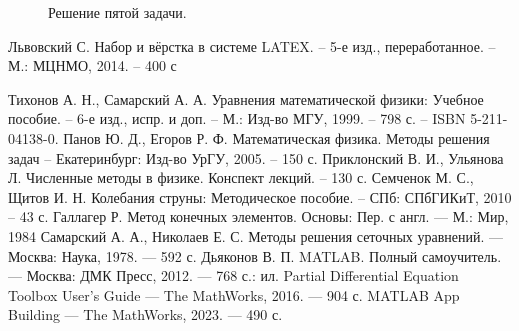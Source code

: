 \documentclass[12pt,a4paper,russian]{report}
\begin{document}
	\begin{figure}[h]
		\caption{Решение пятой задачи.}
		\label{img:fifth_task}
	\end{figure}
	


	\newpage
	\makeatletter
	\begin{thebibliography}{99}
		
		 Львовский С. Набор и вёрстка в системе LATEX. -- 5-е изд., переработанное. -- М.: МЦНМО, 2014. -- 400 с
		
		
		
		
		 Тихонов А. Н., Самарский А. А. Уравнения математической физики: Учебное пособие. -- 6-е изд., испр. и доп. -- М.: Изд-во МГУ, 1999. -- 798 с. -- ISBN 5-211-04138-0.
		 Панов Ю. Д., Егоров Р. Ф. Математическая физика. Методы решения задач -- Екатеринбург: Изд-во УрГУ, 2005. -- 150 с.
		 Приклонский В. И., Ульянова Л. Численные методы в физике. Конспект лекций. -- 130 с.
		 Семченок М. С., Щитов И. Н. Колебания струны: Методическое пособие. -- СПб: СПбГИКиТ, 2010 -- 43 с.
		 Галлагер Р. Метод конечных элементов. Основы: Пер. с англ. — М.: Мир, 1984
		 Самарский А. А., Николаев Е. С. Методы решения сеточных уравнений. — Москва: Наука, 1978. — 592 с.
		 Дьяконов В. П. MATLAB. Полный самоучитель. — Москва: ДМК Пресс, 2012. — 768 с.: ил.
		 Partial Differential Equation Toolbox User's Guide — The MathWorks, 2016. — 904 с.
		 MATLAB App Building — The MathWorks, 2023. — 490 с.
		
	\end{thebibliography}
	
\end{document}
